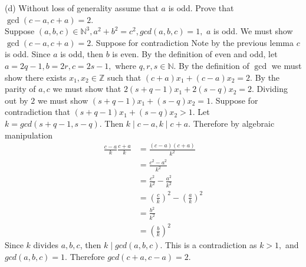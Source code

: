 \documentclass[12pt, letterpaper]{article}
\newcommand{\Z}{\mathbb{Z}}
\newcommand{\N}{\mathbb{N}}
\begin{document}
\iffalse
Suppose for contradiction that $c$ is even.  Therefore working over $\Z / 2 \Z,$ we have that $a^2 + b^2 \equiv 0 \mod 2.$  Note that since if $x \equiv 0 \mod 2,$ then $x^2 \equiv 0^2 = 0 \mod 2,$ and if $x \equiv 1 \mod 2$ then $x^2 \equiv 1^2 = 1 \mod 2,$ then for $\Z / 2 \Z$ $x^2 \equiv x \mod 2.$  Therefore $a^2 + b^2 \equiv a + b \equiv 0 \mod 2.$  Also note working $\Z / 2 \Z,$ $-1 \equiv 2 -1 \equiv 1 \mod 2,$ thus $a+b \equiv 0 \mod 2$ implies $a \equiv -b \mod 2$ which gives us $a \equiv b \mod 2.$  Since $gcd(a,b,c) = 1,$ then by definition there exists $x,y,z \in \Z$ such that $ax + by + cz = 1.$  Looking at the parity of this equation yields,
\begin{align*}
	1 &= ax + by + cz\\
	&\equiv ax + by + 0z\\
	&= ax + by\\
	&\equiv ax + ay\\
	&= a(x+y) \mod 2.
\end{align*}
Since $1 \equiv a(x+y) \mod 2,$ then both $a \equiv 1 \mod 2, x+y \equiv 1 \mod 2.$  Since $a \equiv b \mod 2,$ then $a + b \equiv a + a \equiv 2$
\fi
(d)  Without loss of generality assume that $a$ is odd.  Prove that $\gcd(c-a,c+a)=2$.\\
	Suppose $(a,b,c) \in \N^3, a^2 + b^2 = c^2, gcd(a,b,c) = 1,$ $a$ is odd.  We must show $\gcd(c-a,c+a) = 2.$ Suppose for contradiction  Note by the previous lemma $c$ is odd.  Since $a$ is odd, then $b$ is even.  By the definition of even and odd, let $a=2q -1, b=2r, c = 2s-1,$ where $q,r,s \in \N.$
	By the definition of $\gcd$ we must show there exists $x_1 , x_2 \in \Z$ such that $(c+a)x_1 + (c-a)x_2 = 2.$  By the parity of $a,c$ we must show that $2(s+q-1)x_1 + 2(s-q)x_2 = 2.$  Dividing out by $2$ we must show $(s+q-1)x_1 + (s-q)x_2 = 1.$  Suppose for contradiction that $(s+q-1)x_1 + (s-q)x_2 > 1.$  Let $k = gcd(s+q-1, s-q).$  Then $k \mid c-a, k \mid c+a.$  Therefore by algebraic manipulation \begin{align*}
		\frac{c-a}{k}\frac{c+a}{k} &= \frac{(c-a)(c+a)}{k^2}\\
		&= \frac{c^2-a^2}{k^2}\\
		&= \frac{c^2}{k^2} - \frac{a^2}{k^2}\\
		&= (\frac{c}{k})^2 - (\frac{a}{k})^2\\
		&= \frac{b^2}{k^2}\\
		&= (\frac{b}{k})^2
\end{align*}
Since $k$ divides $a,b,c$, then $k \mid gcd(a,b,c).$  This is a contradiction as $k > 1,$ and $gcd(a,b,c) = 1$.  Therefore $gcd(c+a,c-a)=2.$\\
 
\end{document}
